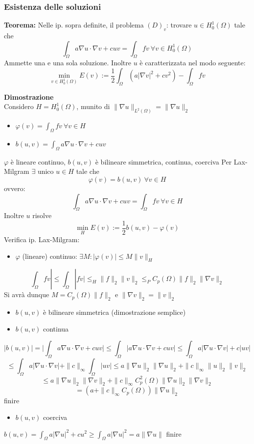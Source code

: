 \subsubsection{Esistenza delle soluzioni}
\begin{tcolorbox}
	\textbf{Teorema: }Nelle ip. sopra definite, il problema $(D)_v$: trovare $u\in H_0^1(\Omega)$ tale che
	\[\int_{\Omega}^{} a\nabla u\cdot \nabla v+cuv=\int_{\Omega}^{} fv\ \forall v\in H_0^1(\Omega)\]
	Ammette una e una sola soluzione. Inoltre $u$ è caratterizzata nel modo seguente:
	\[\min_{v\in H_0^1(\Omega)}E(v):=\frac{1}{2}\int_{\Omega}^{} (a|\nabla v|^2+cv^2)-\int_{\Omega}^{} fv\]

\end{tcolorbox}
\textbf{Dimostrazione} 
\\Considero $H=H^1_0(\Omega)$, munito di $\|\nabla u\|_{L^{2}(\Omega)}=\|\nabla u\|_2$
\begin{itemize}
	\item $\varphi(v)=\int_{\Omega}^{} fv\ \forall v\in H $ 
	\item $b(u,v)=\int_{\Omega}^{} a\nabla u\cdot \nabla v+cuv $ 

\end{itemize}
$\varphi$ è lineare continuo, $b(u,v)$ è bilineare simmetrica, continua, coerciva
Per Lax-Milgram $\exists $ unico $u\in H$ tale che 
\[\varphi(v)=b(u,v)\ \forall v\in H\]
ovvero:
\[\int_{\Omega}^{} a\nabla u\cdot \nabla v +cuv=\int_{\Omega}^{}fv \ \forall v\in H\]
Inoltre $u$ risolve
\[\min_{H}E(v):=\frac{1}{2}b(u,v)-\varphi(v)\]
Verifica ip. Lax-Milgram:
\begin{itemize}
	\item $\varphi$ (lineare) continuo: $\exists M:|\varphi(v)|\le M\|v\|_H$
\end{itemize}
\[\int_{\Omega}^{} fv|\le \int_{\Omega}^{} |fv|\le_H\|f\|_2\|v\|_2\le_PC_p(\Omega)\|f\|_2\|\nabla v\|_2\]
Si avrà dunque $M=C_p(\Omega)\|f\|_2$ e $\|\nabla v\|_2=\|v\|_2$
\begin{itemize}
	\item $b(u,v)$ è bilineare simmetrica (dimostrazione semplice)
\end{itemize}
\begin{itemize}
	\item $b(u,v)$ continua

\end{itemize}
\[|b(u,v)|=\bigg|\int_{\Omega}^{} a\nabla u\cdot \nabla v+cuv\bigg|\le \int_{\Omega}^{} |a\nabla u\cdot \nabla v+cuv|\le \int_{\Omega}^{} a|\nabla u\cdot \nabla v|+c|uv| \]
\[\le \int_{\Omega}^{} a|\nabla u\cdot \nabla v|+\|c\|_{\infty}\int_{\Omega}^{} |uv|   \le a \|\nabla u\|_2 \|\nabla u\|_2+\|c\|_\infty\|u\|_2\|v\|_2\]
\[\le a \|\nabla u\|_2\|\nabla v\|_2+\|c\|_\infty C_p^2(\Omega)\|\nabla u\|_2\|\nabla v\|_2\]
\[=(a+\|c\|_\infty C_p(\Omega))\|\nabla u\|_2\]
finire\\
\begin{itemize}
	\item $b(u,v)$ coerciva

\end{itemize}
$b(u,v)=\int_{\Omega}^{} a|\nabla u|^2+cu^2\ge \int_{\Omega}^{} a|\nabla u|^2=a\|\nabla u\|  $ finire

